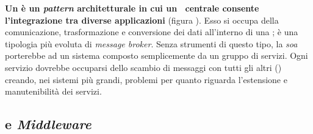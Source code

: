 \textbf{Un  è un \textit{pattern} architetturale in cui un \software\ centrale consente l'integrazione tra diverse applicazioni} (figura \thefigure).
Esso si occupa della comunicazione, trasformazione e conversione dei dati all'interno di una ; è una tipologia più evoluta di \textit{message broker}.
Senza strumenti di questo tipo, la \textit{\acrlong{soa}} porterebbe ad un sistema composto semplicemente da un gruppo di servizi.
Ogni servizio dovrebbe occuparsi dello scambio di messaggi con tutti gli altri () creando, nei sistemi più grandi, problemi per quanto riguarda l'estensione e manutenibilità dei servizi.





\subsection{ e \textit{Middleware}}

